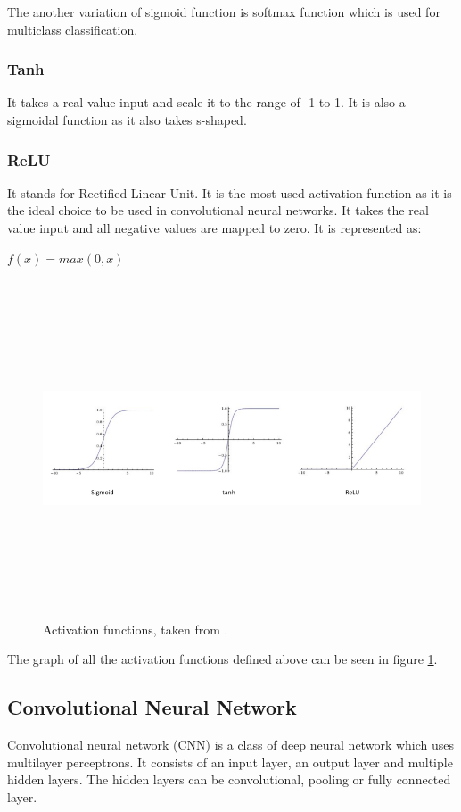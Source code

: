 The another variation of sigmoid function is softmax function which is used for multiclass classification.

\subsubsection{Tanh}
It takes a real value input and scale it to the range of -1 to 1. It is also a sigmoidal function as it also takes s-shaped.


\subsubsection{ReLU}
It stands for Rectified Linear Unit. It is the most used activation function as it is the ideal choice to be used in convolutional neural networks. It takes the real value input and all negative values are mapped to zero. It is represented as:

\begin{center}
$f(x) = max(0, x)$
\end{center}

\begin{figure}[htpb]
	\centering
	\includegraphics[width=15cm,height=10cm,keepaspectratio=true]{images/act-funcs}
	\caption{
		Activation functions, taken from \cite{ujjwalkarn}.
	}
	\label{fig:funcs}
\end{figure}

The graph of all the activation functions defined above can be seen in figure \ref{fig:funcs}.

\subsection{Convolutional Neural Network}
Convolutional neural network (CNN) is a class of deep neural network which uses multilayer perceptrons. It consists of an input layer, an output layer and multiple hidden layers. The hidden layers can be convolutional, pooling or fully connected layer.


